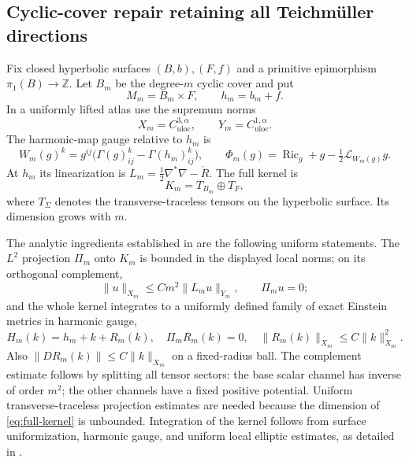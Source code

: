 \documentclass[11pt,a4paper]{article}
\theoremstyle{definition}\newtheorem{definition}[theorem]{Definition}
\theoremstyle{remark}\newtheorem{remark}[theorem]{Remark}
\DeclareMathOperator{\Ric}{Ric}
\newcommand{\Z}{\mathbb Z}
\newcommand{\uloc}{\mathrm{uloc}}
\begin{document}
\subsection{Cyclic-cover repair retaining all Teichm\"uller directions}
Fix closed hyperbolic surfaces $(B,b),(F,f)$ and a primitive epimorphism $\pi_1(B)\to\Z$. Let $B_m$ be the degree-$m$ cyclic cover and put
\[
 M_m=B_m\times F,\qquad h_m=b_m+f.
\]
In a uniformly lifted atlas use the supremum norms
\[
 X_m=C^{3,\alpha}_{\uloc},\qquad Y_m=C^{1,\alpha}_{\uloc}.
\]
The harmonic-map gauge relative to $h_m$ is
\[
 W_m(g)^k=g^{ij}\bigl(\Gamma(g)^k_{ij}-\Gamma(h_m)^k_{ij}\bigr),\qquad
 \Phi_m(g)=\Ric_g+g-\tfrac12\mathcal L_{W_m(g)}g.
\]
At $h_m$ its linearization is $L_m=\tfrac12\nabla^*\nabla-\mathring R$. The full kernel is
\begin{equation}\label{eq:full-kernel}
 K_m=T_{B_m}\oplus T_F,
\end{equation}
where $T_\Sigma$ denotes the transverse-traceless tensors on the hyperbolic surface. Its dimension grows with $m$.

The analytic ingredients established in \cite{source-kernel} are the following uniform statements. The $L^2$ projection $\Pi_m$ onto $K_m$ is bounded in the displayed local norms; on its orthogonal complement,
\begin{equation}\label{eq:kernel-inverse}
 \|u\|_{X_m}\le Cm^2\|L_mu\|_{Y_m},\qquad \Pi_mu=0;
\end{equation}
and the whole kernel integrates to a uniformly defined family of exact Einstein metrics in harmonic gauge,
\begin{equation}\label{eq:integrated-kernel}
 H_m(k)=h_m+k+R_m(k),\quad \Pi_mR_m(k)=0,
 \quad\|R_m(k)\|_{X_m}\le C\|k\|_{X_m}^2.
\end{equation}
Also $\|DR_m(k)\|\le C\|k\|_{X_m}$ on a fixed-radius ball. The complement estimate follows by splitting all tensor sectors: the base scalar channel has inverse of order $m^2$; the other channels have a fixed positive potential. Uniform transverse-traceless projection estimates are needed because the dimension of \eqref{eq:full-kernel} is unbounded. Integration of the kernel follows from surface uniformization, harmonic gauge, and uniform local elliptic estimates, as detailed in \cite{source-kernel}.
\end{document}
